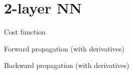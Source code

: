 \section{2-layer NN}

Cost function

Forward propagation (with derivatives)

Backward propagation (with derivatives)

